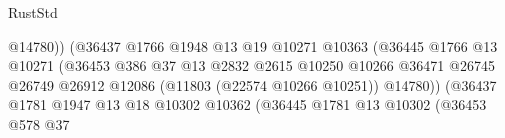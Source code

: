 \begin{lexlean}{RustStd}
\begin{coremodule}
                                                        @14780))
                                                    (@36437
                                                      @1766
                                                      @1948
                                                      @13
                                                      @19
                                                      @10271
                                                      @10363
                                                      (@36445
                                                        @1766
                                                        @13
                                                        @10271
                                                        (@36453
                                                          @386
                                                          @37
                                                          @13
                                                          @2832
                                                          @2615
                                                          @10250
                                                          @10266
                                                          @36471
                                                          @26745
                                                          @26749
                                                          @26912
                                                          @12086
                                                          (@11803 (@22574 @10266 @10251))
                                                          @14780))
                                                      (@36437
                                                        @1781
                                                        @1947
                                                        @13
                                                        @18
                                                        @10302
                                                        @10362
                                                        (@36445
                                                          @1781
                                                          @13
                                                          @10302
                                                          (@36453
                                                            @578
                                                            @37

\end{coremodule}
\end{lexlean}
